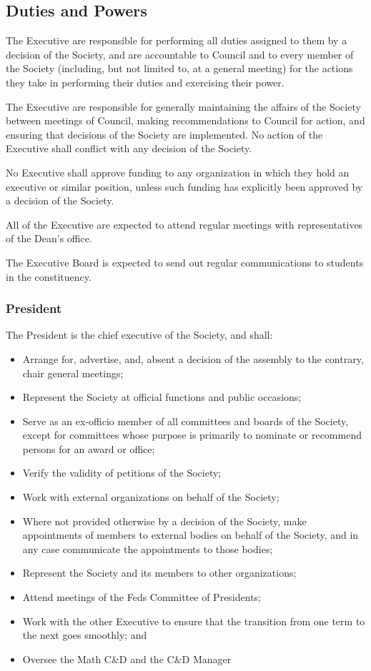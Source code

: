 \subsection{Duties and Powers}
The Executive are responsible for performing all duties assigned to them by a
decision of the Society, and are accountable to Council and to every member of
the Society (including, but not limited to, at a general meeting) for the
actions they take in performing their duties and exercising their power.

The Executive are responsible for generally maintaining the affairs of the
Society between meetings of Council, making recommendations to Council for
action, and ensuring that decisions of the Society are implemented. No action of
the Executive shall conflict with any decision of the Society.

No Executive shall approve funding to any organization in which they hold an
executive or similar position, unless such funding has explicitly been approved
by a decision of the Society.

All of the Executive are expected to attend regular meetings with representatives of
the Dean’s office.

The Executive Board is expected to send out regular communications to students in
the constituency.

\subsubsection{President}
The President is the chief executive of the Society, and shall:
\begin{itemize}
  \item Arrange for, advertise, and, absent a decision of the assembly to the
    contrary, chair general meetings;
  \item Represent the Society at official functions and public occasions;
  \item Serve as an ex-officio member of all committees and boards of the
    Society, except for committees whose purpose is primarily to nominate or
    recommend persons for an award or office;
  \item Verify the validity of petitions of the Society;
  \item Work with external organizations on behalf of the Society;
  \item Where not provided otherwise by a decision of the Society, make
    appointments of members to external bodies on behalf of the Society, and in
    any case communicate the appointments to those bodies;
  \item Represent the Society and its members to other organizations;
  \item Attend meetings of the Feds Committee of Presidents;
  \item Work with the other Executive to ensure that the transition from one
    term to the next goes smoothly; and
  \item Oversee the Math C\&D and the C\&D Manager
\end{itemize}

